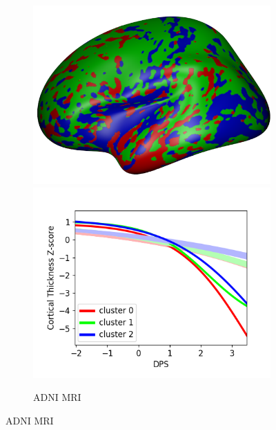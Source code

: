 \begin{figure}
  \begin{subfigure}[b]{\textwidth}
   \centering
  \includegraphics[width=\scalingFactorSubfigBrain \textwidth,trim=0 0 0 20,clip]{images/atrophyExtent24_adniThInitk-meansCl3Pr1Ra1_VDPM_MRF.png} \includegraphics[width=\scalingFactorSubfigBrain \textwidth,trim=0 10 0 30,clip]{images/trajSamplesOneFig_adniThInitk-meansCl3Pr1Ra1_VDPM_MRF.png}
    \caption{ADNI MRI}
    \label{diveClustAdniMri}
  \end{subfigure}


\end{figure}
